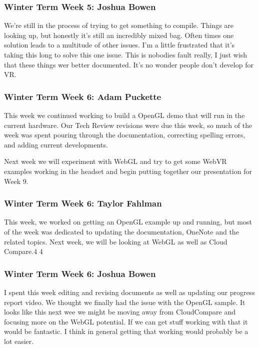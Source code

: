 \documentclass[draftclsnofoot,onecolumn]{IEEEtran}
\begin{document}
\subsubsection{Winter Term Week 5: Joshua Bowen}

We're still in the process of trying to get something to compile. Things are looking up, but honestly it's still an incredibly mixed bag. Often times one solution leads to a multitude of other issues. I'm a little frustrated that it's taking this long to solve this one issue. This is nobodies fault really, I just wish that these things wer better documented. It's no wonder people don't develop for VR.

\subsubsection{Winter Term Week 6: Adam Puckette}

This week we continued working to build a OpenGL demo that will run in the current hardware. Our Tech Review revisions were due this week, so much of the week was spent pouring through the documentation, correcting spelling errors, and adding current developments.

Next week we will experiment with WebGL and try to get some WebVR examples working in the headset and begin putting together our presentation for Week 9.

\subsubsection{Winter Term Week 6: Taylor Fahlman}

This week, we worked on getting an OpenGL example up and running, but most of the week was dedicated to updating the documentation, OneNote and the related topics. Next week, we will be looking at WebGL as well as Cloud Compare.4 4

\subsubsection{Winter Term Week 6: Joshua Bowen}

I spent this week editing and revising documents as well as updating our progress report video. We thought we finally had the issue with the OpenGL sample. It looks like this next wee we might be moving away from CloudCompare and focusing more on the WebGL potential. If we can get stuff working with that it would be fantastic. I think in general getting that working would probably be a lot easier.
\end{document}
